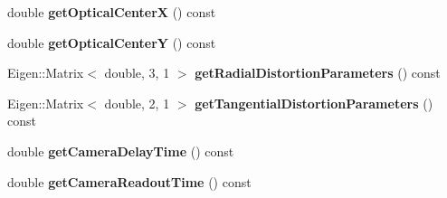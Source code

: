\begin{DoxyCompactItemize}
\item 
\hypertarget{class_calibration_aa101a7999e6eec103dce4ec651c2218b}{double {\bfseries get\-Optical\-Center\-X} () const }\label{class_calibration_aa101a7999e6eec103dce4ec651c2218b}

\item 
\hypertarget{class_calibration_a7486353559a45d424afb1aa6fbfa9f24}{double {\bfseries get\-Optical\-Center\-Y} () const }\label{class_calibration_a7486353559a45d424afb1aa6fbfa9f24}

\item 
\hypertarget{class_calibration_a57798a33c441afe2e0b675008e962af6}{Eigen\-::\-Matrix$<$ double, 3, 1 $>$ {\bfseries get\-Radial\-Distortion\-Parameters} () const }\label{class_calibration_a57798a33c441afe2e0b675008e962af6}

\item 
\hypertarget{class_calibration_ab42ba1d8120e3c22b85204c5dfd98f7f}{Eigen\-::\-Matrix$<$ double, 2, 1 $>$ {\bfseries get\-Tangential\-Distortion\-Parameters} () const }\label{class_calibration_ab42ba1d8120e3c22b85204c5dfd98f7f}

\item 
\hypertarget{class_calibration_a22c6544bba616210e34f9020479a32c6}{double {\bfseries get\-Camera\-Delay\-Time} () const }\label{class_calibration_a22c6544bba616210e34f9020479a32c6}

\item 
\hypertarget{class_calibration_aecbab0b6d724fa68f5af6e038111284b}{double {\bfseries get\-Camera\-Readout\-Time} () const }\label{class_calibration_aecbab0b6d724fa68f5af6e038111284b}

\end{DoxyCompactItemize}
